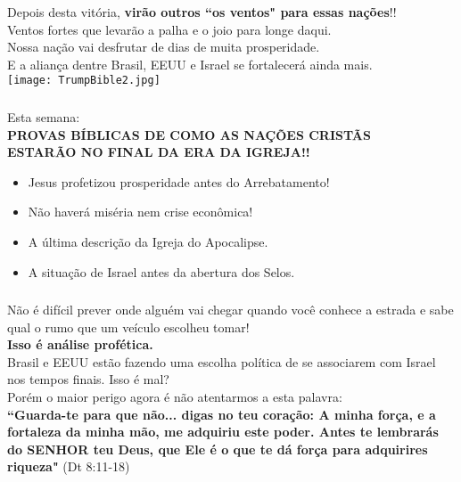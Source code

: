 \documentclass[aspectratio=169]{beamer}
\begin{document}
\begin{frame}
  \centering
	Depois desta vitória, \textbf{virão outros ``os ventos" para essas nações}!!\\
	Ventos fortes que levarão a palha e o joio para longe daqui. \\
	Nossa nação vai desfrutar de dias de muita prosperidade. \\
	E a aliança dentre Brasil, EEUU e Israel se fortalecerá ainda mais.\\
	\vspace{.5cm}
	\centering
          \texttt{[image: TrumpBible2.jpg]}
\end{frame}



\begin{frame}
	  \frametitle{}
	  \framesubtitle{}
	    \centering
  {\LARGE Esta semana:}\\
  \vspace{.5cm}
  \textbf{PROVAS BÍBLICAS DE COMO AS NAÇÕES CRISTÃS}\\
  \textbf{ESTARÃO NO FINAL DA ERA DA IGREJA!!}\\
		  \vspace{.5cm}
    \begin{itemize}
      \item Jesus profetizou prosperidade antes do Arrebatamento!
      \item Não haverá miséria nem crise econômica!
      \item A última descrição da Igreja do Apocalipse.
      \item A situação de Israel antes da abertura dos Selos.
    \end{itemize}
\end{frame}

	
	
\begin{frame}
	  \frametitle{}
	  \framesubtitle{}
	    \centering
		Não é difícil prever onde alguém vai chegar quando você conhece a estrada e sabe qual o rumo que um veículo escolheu tomar!\\
		\textbf{Isso é análise profética.}\\
	Brasil e EEUU estão fazendo uma escolha política de se associarem com Israel nos tempos finais. Isso é mal?\\
			\vspace{.5cm}
	Porém o maior perigo agora é não atentarmos a esta palavra:\\
			\textbf{``Guarda-te para que não... digas no teu coração: A minha força, e a fortaleza da minha mão, me adquiriu este poder.
Antes te lembrarás do SENHOR teu Deus, que Ele é o que te dá força para adquirires riqueza"} (Dt 8:11-18)	
	\end{frame}
	
\end{document}
